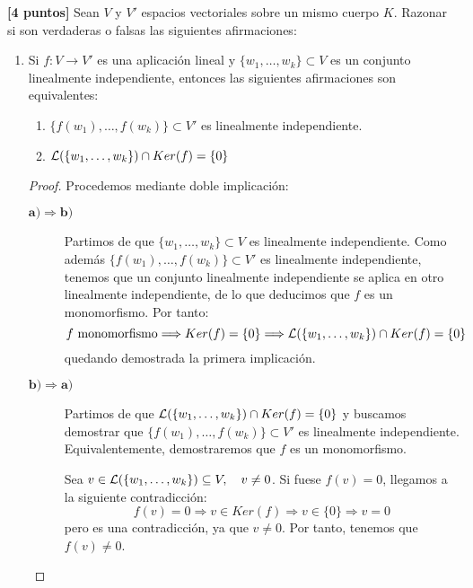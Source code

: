 \documentclass[12pt]{article}
\begin{document}
\begin{ejercicio}
    \textbf{[4 puntos]} Sean $V$ y $V'$ espacios vectoriales sobre un mismo cuerpo $K$. Razonar si son verdaderas o falsas las siguientes afirmaciones:
    \begin{enumerate}
        \item Si $f:V\to V'$ es una aplicación lineal y $\{w_1,\dots,w_k\}\subset V$ es un conjunto linealmente independiente, entonces las siguientes afirmaciones son equivalentes:
        \begin{enumerate}
            \item $\{f(w_1),\dots,f(w_k)\} \subset V'$ es linealmente independiente.

            \item $\mathcal{L}(\{w_1,\dots,w_k\})\cap Ker(f)=\{0\}$
        \end{enumerate}
        \begin{proof} Procedemos mediante doble implicación:
        \begin{description}
            \item [$\mathbf{a)\Longrightarrow b)}$]
            Partimos de que $\{w_1,\dots,w_k\}\subset V$ es linealmente independiente. Como además $\{f(w_1),\dots,f(w_k)\} \subset V'$ es linealmente independiente, tenemos que un conjunto linealmente independiente se aplica en otro linealmente independiente, de lo que deducimos que $f$ es un monomorfismo. Por tanto:
            \begin{equation*}
                f \text{ monomorfismo} \Longrightarrow Ker(f)=\{0\} \Longrightarrow \mathcal{L}(\{w_1,\dots,w_k\})\cap Ker(f)=\{0\}
            \end{equation*}
            quedando demostrada la primera implicación.

            \item [$\mathbf{b)\Longrightarrow a)}$] Partimos de que $\mathcal{L}(\{w_1,\dots,w_k\})\cap Ker(f)=\{0\}$ y buscamos demostrar que $\{f(w_1),\dots,f(w_k)\} \subset V'$ es linealmente independiente. Equivalentemente, demostraremos que $f$ es un monomorfismo.

            Sea $v\in \mathcal{L}(\{w_1,\dots,w_k\})\subseteq V, \quad v\neq 0$. Si fuese $f(v)=0$, llegamos a la siguiente contradicción:
            \begin{equation*}
                f(v)=0\Longrightarrow v\in Ker(f)\Longrightarrow v\in \{0\}\Longrightarrow v=0
            \end{equation*}
            pero es una contradicción, ya que $v\neq 0$. Por tanto, tenemos que $f(v)\neq 0$.


\end{description}
\end{proof}
\end{enumerate}
\end{ejercicio}
\end{document}
